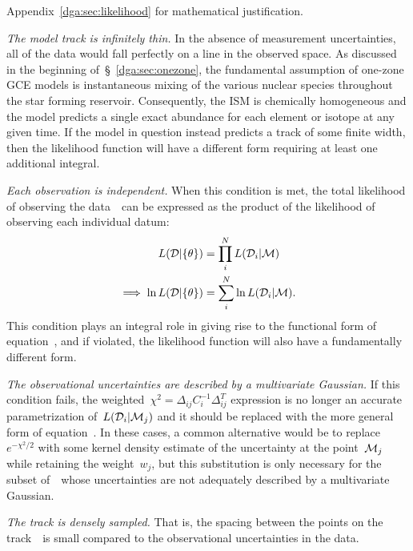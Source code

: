 Appendix~\ref{dga:sec:likelihood} for mathematical justification.
\par
\textit{The model track is infinitely thin.}
In the absence of measurement uncertainties, all of the data would fall
perfectly on a line in the observed space.
As discussed in the beginning of~\S~\ref{dga:sec:onezone}, the fundamental
assumption of one-zone GCE models is instantaneous mixing of the various
nuclear species throughout the star forming reservoir.
Consequently, the ISM is chemically homogeneous and the model predicts a single
exact abundance for each element or isotope at any given time.
If the model in question instead predicts a track of some finite width, then
the likelihood function will have a different form requiring at least one
additional integral.
\par
\textit{Each observation is independent.}
When this condition is met, the total likelihood of observing the
data~~can be expressed as the product of the likelihood of observing
each individual datum:
\begin{subequations}\begin{align}
L(\mathcal{D} | \{\theta\}) &= \prod_i^N L(\mathcal{D}_i | \mathcal{M})
\\
\implies \ln L(\mathcal{D} | \{\theta\}) &= \sum_i^N \ln
L(\mathcal{D}_i | \mathcal{M}).
\end{align}\end{subequations}
This condition plays an integral role in giving rise to the functional form of
equation~, and if violated, the likelihood function will
also have a fundamentally different form.
\par
\textit{The observational uncertainties are described by a multivariate
Gaussian.}
If this condition fails, the weighted~$\chi^2 = \Delta_{ij}C_i^{-1}\Delta_{ij}^T$
expression is no longer an accurate parametrization of~$L(\mathcal{D}_i |
\mathcal{M}_j)$ and it should be replaced with the more general form of
equation~.
In these cases, a common alternative would be to replace~$e^{-\chi^2 / 2}$ with
some kernel density estimate of the uncertainty at the point~$\mathcal{M}_j$
while retaining the weight~$w_j$, but this substitution is only necessary for
the subset of~~whose uncertainties are not adequately described by a
multivariate Gaussian.
\par
\textit{The track is densely sampled.}
That is, the spacing between the points on the track~~is small
compared to the observational uncertainties in the data.
